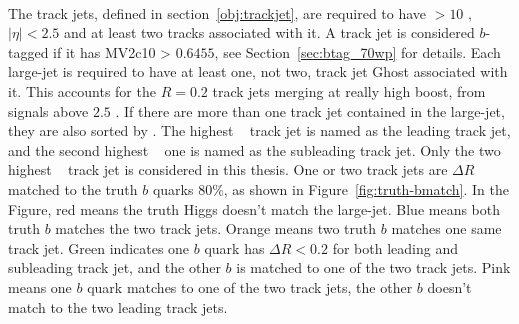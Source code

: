 \paragraph{}
The track jets, defined in section~\ref{obj:trackjet}, are required to have \pt $> 10$ \GeV, $|\eta| < 2.5$ and at least two tracks associated with it. 
A track jet is considered $b$-tagged if it has MV2c10 > $0.6455$, see Section~\ref{sec:btag_70wp} for details. 
Each large-\R jet is required to have at least one, not two, track jet Ghost associated with it.
This accounts for the $R=0.2$ track jets merging at really high boost, from signals above $2.5$ \TeV.
If there are more than one track jet contained in the large-\R jet, they are also sorted by \pt.
The highest \pt~ track jet is named as the leading track jet, and the second highest \pt~ one is named as the subleading track jet.
Only the two highest \pt~ track jet is considered in this thesis.
One or two track jets are $\Delta R$ matched to the truth $b$ quarks $80\%$, as shown in Figure~\ref{fig:truth-bmatch}. 
In the Figure, red means the truth Higgs doesn't match the large-\R jet. Blue means both truth $b$ matches the two track jets. Orange means two truth $b$ matches one same track jet. Green indicates one $b$ quark has $\Delta R<0.2$ for both leading and subleading track jet, and the other $b$ is matched to one of the two track jets. Pink means one $b$ quark matches to one of the two track jets, the other $b$ doesn't match to the two leading track jets.

